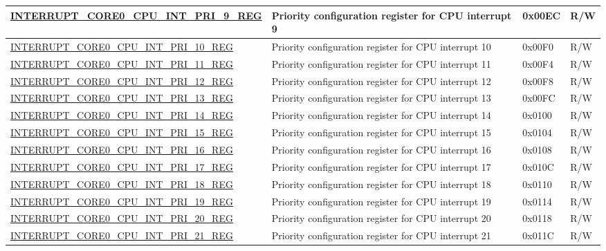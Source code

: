 \begin{longtable}{ | p{10cm} | m{10cm} | m{1.3cm} | m{1.0cm} | }
\hyperref[regdesc:INTERRUPTCORE0CPUINTPRI0REG]{INTERRUPT\_CORE0\_CPU\_INT\_PRI\_9\_REG} & Priority configuration register for CPU interrupt 9 & 0x00EC & R/W \\ \hline
\hyperref[regdesc:INTERRUPTCORE0CPUINTPRI0REG]{INTERRUPT\_CORE0\_CPU\_INT\_PRI\_10\_REG} & Priority configuration register for CPU interrupt 10 & 0x00F0 & R/W \\ \hline
\hyperref[regdesc:INTERRUPTCORE0CPUINTPRI0REG]{INTERRUPT\_CORE0\_CPU\_INT\_PRI\_11\_REG} & Priority configuration register for CPU interrupt 11 & 0x00F4 & R/W \\ \hline
\hyperref[regdesc:INTERRUPTCORE0CPUINTPRI0REG]{INTERRUPT\_CORE0\_CPU\_INT\_PRI\_12\_REG} & Priority configuration register for CPU interrupt 12 & 0x00F8 & R/W \\ \hline
\hyperref[regdesc:INTERRUPTCORE0CPUINTPRI0REG]{INTERRUPT\_CORE0\_CPU\_INT\_PRI\_13\_REG} & Priority configuration register for CPU interrupt 13 & 0x00FC & R/W \\ \hline
\hyperref[regdesc:INTERRUPTCORE0CPUINTPRI0REG]{INTERRUPT\_CORE0\_CPU\_INT\_PRI\_14\_REG} & Priority configuration register for CPU interrupt 14 & 0x0100 & R/W \\ \hline
\hyperref[regdesc:INTERRUPTCORE0CPUINTPRI0REG]{INTERRUPT\_CORE0\_CPU\_INT\_PRI\_15\_REG} & Priority configuration register for CPU interrupt 15 & 0x0104 & R/W \\ \hline
\hyperref[regdesc:INTERRUPTCORE0CPUINTPRI0REG]{INTERRUPT\_CORE0\_CPU\_INT\_PRI\_16\_REG} & Priority configuration register for CPU interrupt 16 & 0x0108 & R/W \\ \hline
\hyperref[regdesc:INTERRUPTCORE0CPUINTPRI0REG]{INTERRUPT\_CORE0\_CPU\_INT\_PRI\_17\_REG} & Priority configuration register for CPU interrupt 17 & 0x010C & R/W \\ \hline
\hyperref[regdesc:INTERRUPTCORE0CPUINTPRI0REG]{INTERRUPT\_CORE0\_CPU\_INT\_PRI\_18\_REG} & Priority configuration register for CPU interrupt 18 & 0x0110 & R/W \\ \hline
\hyperref[regdesc:INTERRUPTCORE0CPUINTPRI0REG]{INTERRUPT\_CORE0\_CPU\_INT\_PRI\_19\_REG} & Priority configuration register for CPU interrupt 19 & 0x0114 & R/W \\ \hline
\hyperref[regdesc:INTERRUPTCORE0CPUINTPRI0REG]{INTERRUPT\_CORE0\_CPU\_INT\_PRI\_20\_REG} & Priority configuration register for CPU interrupt 20 & 0x0118 & R/W \\ \hline
\hyperref[regdesc:INTERRUPTCORE0CPUINTPRI0REG]{INTERRUPT\_CORE0\_CPU\_INT\_PRI\_21\_REG} & Priority configuration register for CPU interrupt 21 & 0x011C & R/W \\ \hline

\end{longtable}
